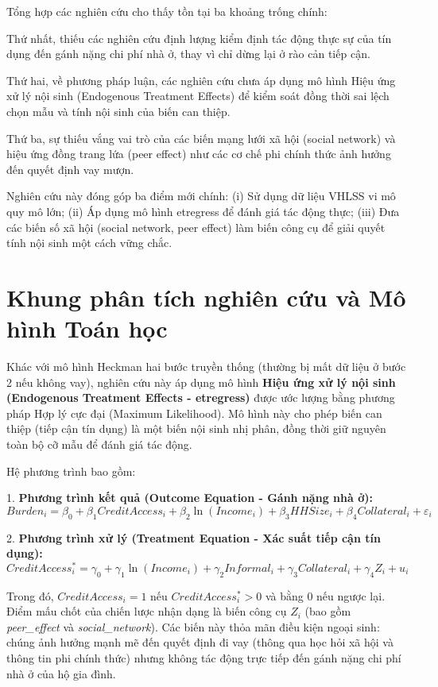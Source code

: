 \documentclass[12pt,a4paper]{report}
\begin{document}
Tổng hợp các nghiên cứu cho thấy tồn tại ba khoảng trống chính:

Thứ nhất, thiếu các nghiên cứu định lượng kiểm định tác động thực sự của tín dụng đến gánh nặng chi phí nhà ở, thay vì chỉ dừng lại ở rào cản tiếp cận.

Thứ hai, về phương pháp luận, các nghiên cứu chưa áp dụng mô hình Hiệu ứng xử lý nội sinh (Endogenous Treatment Effects) để kiểm soát đồng thời sai lệch chọn mẫu và tính nội sinh của biến can thiệp.

Thứ ba, sự thiếu vắng vai trò của các biến mạng lưới xã hội (social network) và hiệu ứng đồng trang lứa (peer effect) như các cơ chế phi chính thức ảnh hưởng đến quyết định vay mượn.

Nghiên cứu này đóng góp ba điểm mới chính: (i) Sử dụng dữ liệu VHLSS vi mô quy mô lớn; (ii) Áp dụng mô hình etregress để đánh giá tác động thực; (iii) Đưa các biến số xã hội (social network, peer effect) làm biến công cụ để giải quyết tính nội sinh một cách vững chắc.

\section{Khung phân tích nghiên cứu và Mô hình Toán học}

Khác với mô hình Heckman hai bước truyền thống (thường bị mất dữ liệu ở bước 2 nếu không vay), nghiên cứu này áp dụng mô hình \textbf{Hiệu ứng xử lý nội sinh (Endogenous Treatment Effects - etregress)} được ước lượng bằng phương pháp Hợp lý cực đại (Maximum Likelihood). Mô hình này cho phép biến can thiệp (tiếp cận tín dụng) là một biến nội sinh nhị phân, đồng thời giữ nguyên toàn bộ cỡ mẫu để đánh giá tác động.

Hệ phương trình bao gồm:

1. \textbf{Phương trình kết quả (Outcome Equation - Gánh nặng nhà ở):}
$$ Burden_i = \beta_0 + \beta_1 CreditAccess_i + \beta_2 \ln(Income_i) + \beta_3 HHSize_i + \beta_4 Collateral_i + \varepsilon_i $$

2. \textbf{Phương trình xử lý (Treatment Equation - Xác suất tiếp cận tín dụng):}
$$ CreditAccess_i^* = \gamma_0 + \gamma_1 \ln(Income_i) + \gamma_2 Informal_i + \gamma_3 Collateral_i + \gamma_4 Z_i + u_i $$

Trong đó, $CreditAccess_i = 1$ nếu $CreditAccess_i^* > 0$ và bằng $0$ nếu ngược lại. Điểm mấu chốt của chiến lược nhận dạng là biến công cụ $Z_i$ (bao gồm \textit{peer\_effect} và \textit{social\_network}). Các biến này thỏa mãn điều kiện ngoại sinh: chúng ảnh hưởng mạnh mẽ đến quyết định đi vay (thông qua học hỏi xã hội và thông tin phi chính thức) nhưng không tác động trực tiếp đến gánh nặng chi phí nhà ở của hộ gia đình.
\end{document}
